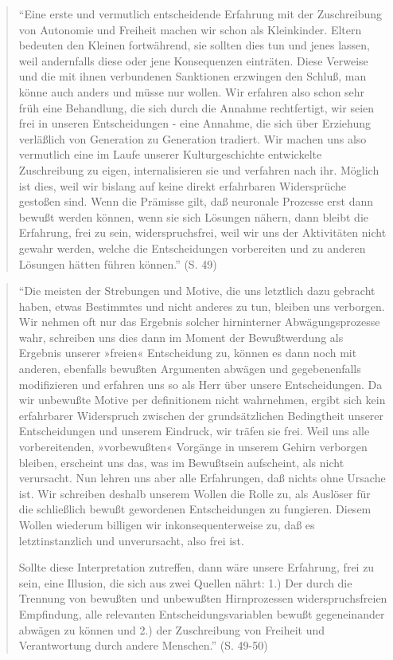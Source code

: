 \documentclass[
  a4paper,
]{report}
\begin{document}
\begin{quote}
``Eine erste und vermutlich entscheidende Erfahrung mit der Zuschreibung von Autonomie und Freiheit machen wir schon als Kleinkinder. Eltern bedeuten den Kleinen fortwährend, sie sollten dies tun und jenes lassen, weil andernfalls diese oder jene Konsequenzen einträten. Diese Verweise und die mit ihnen verbundenen Sanktionen erzwingen den Schluß, man könne auch anders und müsse nur wollen. Wir erfahren also schon sehr früh eine Behandlung, die sich durch die Annahme rechtfertigt, wir seien frei in unseren Entscheidungen - eine Annahme, die sich über Erziehung verläßlich von Generation zu Generation tradiert. Wir machen uns also vermutlich eine im Laufe unserer Kulturgeschichte entwickelte Zuschreibung zu eigen, internalisieren sie und verfahren nach ihr. Möglich ist dies, weil wir bislang auf keine direkt erfahrbaren Widersprüche gestoßen sind. Wenn die Prämisse gilt, daß neuronale Prozesse erst dann bewußt werden können, wenn sie sich Lösungen nähern, dann bleibt die Erfahrung, frei zu sein, widerspruchsfrei, weil wir uns der Aktivitäten nicht gewahr werden, welche die Entscheidungen vorbereiten und zu anderen Lösungen hätten führen können.'' (S. 49)
\end{quote}

\begin{quote}
``Die meisten der Strebungen und Motive, die uns letztlich dazu gebracht haben, etwas Bestimmtes und nicht anderes zu tun, bleiben uns verborgen. Wir nehmen oft nur das Ergebnis solcher hirninterner Abwägungsprozesse wahr, schreiben uns dies dann im Moment der Bewußtwerdung als Ergebnis unserer »freien« Entscheidung zu, können es dann noch mit anderen, ebenfalls bewußten Argumenten abwägen und gegebenenfalls modifizieren und erfahren uns so als Herr über unsere Entscheidungen. Da wir unbewußte Motive per definitionem nicht wahrnehmen, ergibt sich kein erfahrbarer Widerspruch zwischen der grundsätzlichen Bedingtheit unserer Entscheidungen und unserem Eindruck, wir träfen sie frei. Weil uns alle vorbereitenden, »vorbewußten« Vorgänge in unserem Gehirn verborgen bleiben, erscheint uns das, was im Bewußtsein aufscheint, als nicht verursacht. Nun lehren uns aber alle Erfahrungen, daß nichts ohne Ursache ist. Wir schreiben deshalb unserem Wollen die Rolle zu, als Auslöser für die schließlich bewußt gewordenen Entscheidungen zu fungieren. Diesem Wollen wiederum billigen wir inkonsequenterweise zu, daß es letztinstanzlich und unverursacht, also frei ist.

Sollte diese Interpretation zutreffen, dann wäre unsere Erfahrung, frei zu sein, eine Illusion, die sich aus zwei Quellen nährt: 1.) Der durch die Trennung von bewußten und unbewußten Hirnprozessen widerspruchsfreien Empfindung, alle relevanten Entscheidungsvariablen bewußt gegeneinander abwägen zu können und 2.) der Zuschreibung von Freiheit und Verantwortung durch andere Menschen.'' (S. 49-50)
\end{quote}
\end{document}
